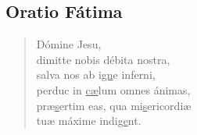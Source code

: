 \subsection*{Oratio F\'atima}
\vspace{-0.5em}

\begin{verse}
        D\'omine Jesu,
\\      dimitte nobis d\'ebita nostra,
\\      salva nos ab i\ul{gn}e inferni,
\\      perduc in \ul{cæ}lum omnes \'animas,
\\      præ\ul{s}ertim eas, qua mi\ul{s}ericordiæ
\\\vin      tuæ m\'axime indi\ul{ge}nt.
\end{verse}